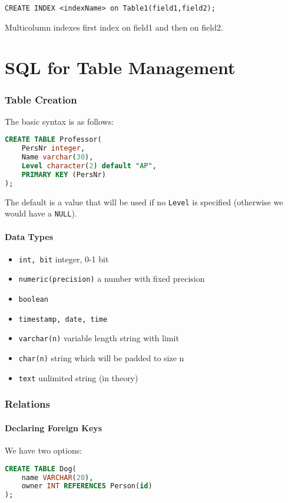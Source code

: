 \documentclass{sciposter}
\renewcommand{\t}[1]{\texttt{#1}}
\begin{document}
\begin{multicols}{3}
\t{CREATE INDEX <indexName> on Table1(field1,field2);}

Multicolumn indexes first index on field1 and then on field2.


\vfill\null 
\columnbreak


\part{SQL for Table Management}

\section*{Table Creation}
The basic syntax is as follows:
\begin{lstlisting}[language=SQL]
CREATE TABLE Professor(
	PersNr integer,
	Name varchar(30),
	Level character(2) default "AP",
	PRIMARY KEY (PersNr)
);
\end{lstlisting}
The default is a value that will be used if no \t{Level} is specified (otherwise we would have a \t{NULL}).

\subsection*{Data Types}

\begin{itemize}
	\item \t{int, bit} integer, 0-1 bit
	\item \t{numeric(precision)} a number with fixed precision
	\item \t{boolean} 
	\item \t{timestamp, date, time}
	\item \t{varchar(n)} variable length string with limit
	\item \t{char(n)} string which will be padded to size n
	\item \t{text} unlimited string (in theory)
\end{itemize}

\section*{Relations}

\subsection*{Declaring Foreign Keys}

We have two options:
\begin{lstlisting}[language=SQL]
CREATE TABLE Dog(
	name VARCHAR(20),
	owner INT REFERENCES Person(id)
);
\end{lstlisting}


\end{multicols}
\end{document}
